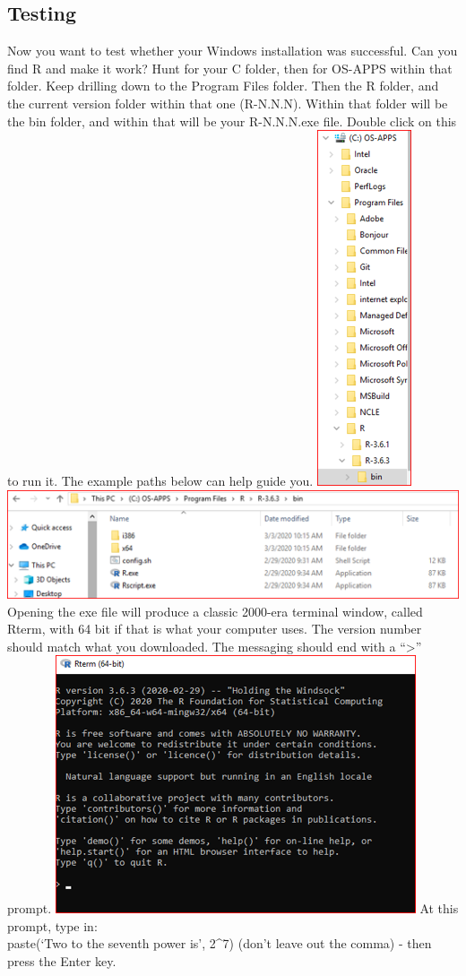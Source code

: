\documentclass[
]{book}
\begin{document}
\hypertarget{testing}{%
\subsection{Testing}\label{testing}}

Now you want to test whether your Windows installation was successful. Can you find R and make it work?
Hunt for your C folder, then for OS-APPS within that folder. Keep drilling down to the Program Files folder. Then the R folder, and the current version folder within that one (R-N.N.N). Within that folder will be the bin folder, and within that will be your R-N.N.N.exe file. Double click on this to run it. The example paths below can help guide you.
\includegraphics{images/installwin-path2.png}
\includegraphics{images/installrpath.png}
Opening the exe file will produce a classic 2000-era terminal window, called Rterm, with 64 bit if that is what your computer uses. The version number should match what you downloaded. The messaging should end with a ``\textgreater{}'' prompt.
\includegraphics{images/windowsrterm.png}
At this prompt, type in:\\
paste(`Two to the seventh power is', 2\^{}7)
(don't leave out the comma) - then press the Enter key.
\end{document}
